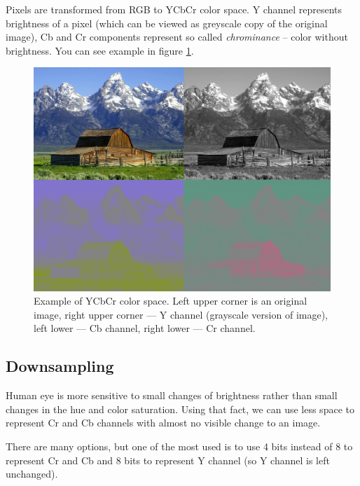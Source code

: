 Pixels are transformed from RGB to YCbCr color space. Y channel represents
brightness of a pixel ({which can be viewed as greyscale copy of the original image}),
Cb and Cr components represent so called \textit{chrominance} -- color without brightness. 
You can see example in figure \ref{img:YCbCr}.


\begin{figure}
\centerline{\includegraphics[height=0.4\textheight]{images/Barns_grand_tetons_YCbCr_separation_quad.jpg}}
\caption[Example of YCbCr color space (Public domain)]{Example of YCbCr color space. 
Left upper corner is an original image,
right upper corner --- Y channel (grayscale version of image),
left lower --- Cb channel,
right lower --- Cr channel.}
\label{img:YCbCr}
\end{figure}

\subsection{Downsampling}

Human eye is more sensitive to small changes of brightness rather 
than small changes in the hue and color saturation. Using that fact, 
we can use less space to represent Cr and Cb channels with almost no visible change
to an image. 

There are many options, but one of the most used is to use 4 bits instead of 8
to represent Cr and Cb and 8 bits to represent Y channel (so Y channel is left unchanged).

